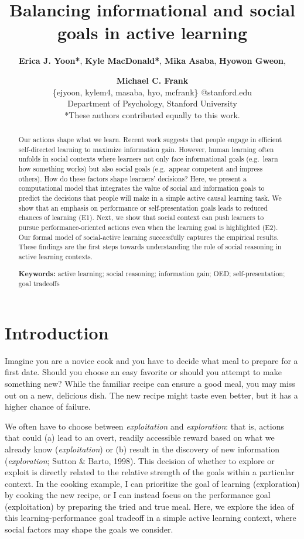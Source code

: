 \documentclass[10pt, letterpaper]{article}
\title{Balancing informational and social goals in active learning}
\author{{\large \bf Erica J. Yoon*}, {\large \bf Kyle MacDonald*}, {\large \bf Mika Asaba}, {\large \bf Hyowon Gweon}, \and {\large \bf Michael C. Frank} \\ \{ejyoon, kylem4, masaba, hyo, mcfrank\} @stanford.edu \\ Department of Psychology, Stanford University \\ *These authors contributed equally to this work.}
\begin{document}
\maketitle

\begin{abstract}
Our actions shape what we learn. Recent work suggests that people engage
in efficient self-directed learning to maximize information gain.
However, human learning often unfolds in social contexts where learners
not only face informational goals (e.g.~learn how something works) but
also social goals (e.g.~appear competent and impress others). How do
these factors shape learners' decisions? Here, we present a
computational model that integrates the value of social and information
goals to predict the decisions that people will make in a simple active
causal learning task. We show that an emphasis on performance or
self-presentation goals leads to reduced chances of learning (E1). Next,
we show that social context can push learners to pursue
performance-oriented actions even when the learning goal is highlighted
(E2). Our formal model of social-active learning successfully captures
the empirical results. These findings are the first steps towards
understanding the role of social reasoning in active learning contexts.

\textbf{Keywords:}
active learning; social reasoning; information gain; OED;
self-presentation; goal tradeoffs
\end{abstract}

\section{Introduction}\label{introduction}

Imagine you are a novice cook and you have to decide what meal to
prepare for a first date. Should you choose an easy favorite or should
you attempt to make something new? While the familiar recipe can ensure
a good meal, you may miss out on a new, delicious dish. The new recipe
might taste even better, but it has a higher chance of failure.

We often have to choose between \emph{exploitation} and
\emph{exploration}: that is, actions that could (a) lead to an overt,
readily accessible reward based on what we already know
(\emph{exploitation}) or (b) result in the discovery of new information
(\emph{exploration}; Sutton \& Barto, 1998). This decision of whether to
explore or exploit is directly related to the relative strength of the
goals within a particular context. In the cooking example, I can
prioritize the goal of learning (exploration) by cooking the new recipe,
or I can instead focus on the performance goal (exploitation) by
preparing the tried and true meal. Here, we explore the idea of this
learning-performance goal tradeoff in a simple active learning context,
where social factors may shape the goals we consider.
\end{document}
